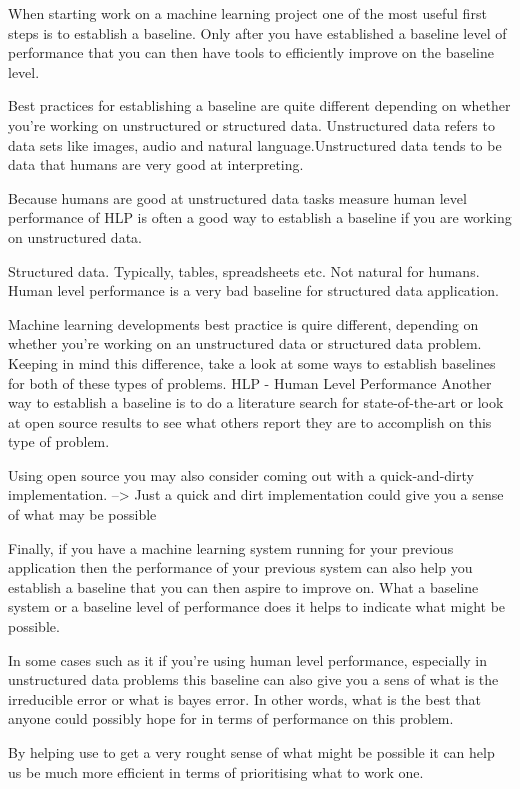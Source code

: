 When starting work on a machine learning project one of the most useful first steps is to establish a baseline.
Only after you have established a baseline level of performance that you can then have tools to efficiently improve on the baseline level.

Best practices for establishing a baseline are quite different depending on whether you're working on unstructured or structured data.
Unstructured data refers to data sets like images, audio and natural language.Unstructured data tends to be data that humans are very good at interpreting.

Because humans are good at unstructured data tasks measure human level performance of HLP is often a good way to establish a baseline if you are working on unstructured data.

Structured data.
Typically, tables, spreadsheets etc.
Not natural for humans.
Human level performance is a very bad baseline for structured data application.


Machine learning developments best practice is quire different, depending on whether you're working on an unstructured data or structured data problem.
Keeping in mind this difference, take a look at some ways to establish baselines for both of these types of problems.
HLP - Human Level Performance
Another way to establish a baseline is to do a literature search for state-of-the-art or look at open source results to see what others report they are to accomplish on this type of problem.

Using open source you may also consider coming out with a quick-and-dirty implementation.
--> Just a quick and dirt implementation could give you a sense of what may be possible

Finally, if you have a machine learning system running for your previous application then the performance of your previous system can also help you establish a baseline that you can then aspire to improve on.
What a baseline system or a baseline level of performance does it helps to indicate what might be possible.

In some cases such as it if you're using human level performance, especially in unstructured data problems this baseline can also give you a sens of what is the irreducible error or what is bayes error.
In other words, what is the best that anyone could possibly hope for in terms of performance on this problem.

By helping use to get a very rought sense of what might be possible it can help us be much more efficient in terms of  prioritising what to work one.

